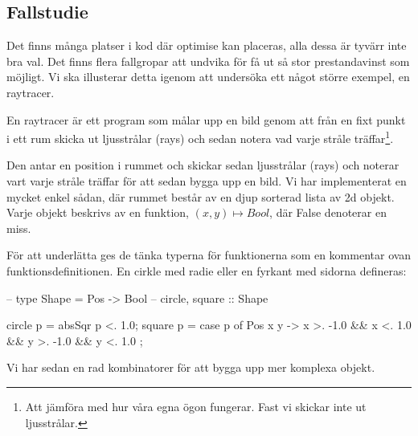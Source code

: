 \documentclass[../Optimise]{subfiles}
\begin{document}
\subsection{Fallstudie}


Det finns många platser i kod där optimise kan placeras, alla dessa är tyvärr inte bra val. Det finns flera fallgropar att undvika för få ut så stor prestandavinst som möjligt. Vi ska illusterar detta igenom att undersöka ett något större exempel, en raytracer.

En raytracer är ett program som målar upp en bild genom att från en fixt punkt i ett rum skicka ut ljusstrålar (rays) och sedan notera vad varje stråle träffar\footnote{Att jämföra med hur våra egna ögon fungerar. Fast vi skickar inte ut ljusstrålar.}.


 Den antar en position i rummet och skickar sedan ljusstrålar (rays) och noterar vart varje stråle träffar för att sedan bygga upp en bild. Vi har implementerat en mycket enkel sådan, där rummet består av en djup sorterad lista av 2d objekt. Varje objekt beskrivs av en funktion, $(x,y) \mapsto Bool$, där False denoterar en miss.
 

För att underlätta ges de tänka typerna för funktionerna som en kommentar ovan funktionsdefinitionen.
En cirkle med radie  eller en fyrkant med sidorna  defineras:
\begin{codeEx}
-- type Shape = Pos -> Bool
-- circle, square :: Shape

circle p = absSqr p <. 1.0;
square p = case p of
    { Pos x y -> x >. -1.0 && x <. 1.0
              && y >. -1.0 && y <. 1.0
    };

\end{codeEx}

Vi har sedan en rad kombinatorer för att bygga upp mer komplexa objekt.

\end{document}
